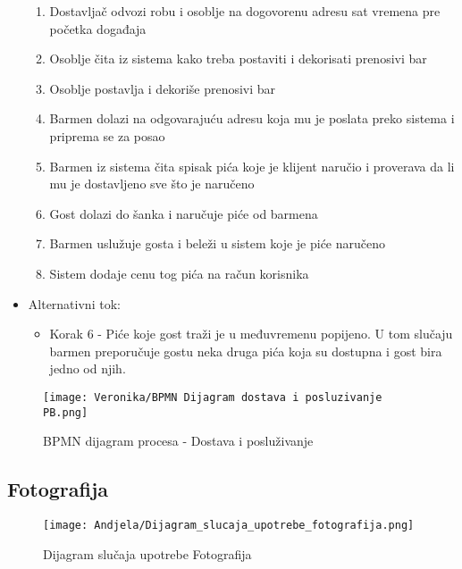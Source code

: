 \documentclass[a4paper]{article}
\begin{document}
\begin{itemize}
\begin{enumerate}
           \item Dostavljač odvozi robu i osoblje na dogovorenu adresu sat vremena pre početka događaja 
		    \item Osoblje čita iz sistema kako treba postaviti i dekorisati prenosivi bar 
		    \item Osoblje postavlja i dekoriše prenosivi bar
		    \item Barmen dolazi na odgovarajuću adresu koja mu je poslata preko sistema i priprema se za posao
            \item Barmen iz sistema čita spisak pića koje je klijent naručio i proverava da li mu je dostavljeno sve što je naručeno
           \item Gost dolazi do šanka i naručuje piće od barmena
		   \item Barmen uslužuje gosta i beleži u sistem koje je piće naručeno
		   \item Sistem dodaje cenu tog pića na račun korisnika
        \end{enumerate}
     \item Alternativni tok:
        \begin{itemize}
	      \item	Korak 6 - Piće koje gost traži je u međuvremenu popijeno. U tom slučaju barmen preporučuje gostu neka druga pića koja su dostupna i gost bira jedno od njih.  
	      \end{itemize}
\end{itemize}


\begin{figure}[H]
    \centering
    \texttt{[image: Veronika/BPMN Dijagram dostava i posluzivanje PB.png]}
    \caption{BPMN dijagram procesa - Dostava i posluživanje}
    \label{fig:PrenosiviBar}
\end{figure}


\subsection{Fotografija}

\begin{figure}[H]
    \centering
    \texttt{[image: Andjela/Dijagram\_slucaja\_upotrebe\_fotografija.png]}
    \caption{Dijagram slučaja upotrebe Fotografija}
    \label{fig:PrenosiviBar}
\end{figure}
\end{document}
